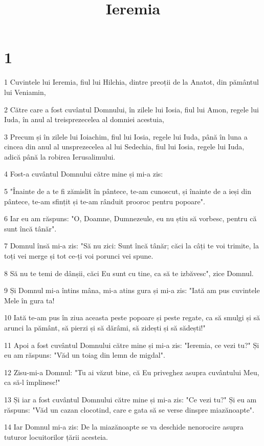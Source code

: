 

\title{Ieremia}


\chapter{1}

\par 1 Cuvintele lui Ieremia, fiul lui Hilchia, dintre preoții de la Anatot, din pământul lui Veniamin,
\par 2 Către care a fost cuvântul Domnului, în zilele lui Iosia, fiul lui Amon, regele lui Iuda, în anul al treisprezecelea al domniei acestuia,
\par 3 Precum și în zilele lui Ioiachim, fiul lui Iosia, regele lui Iuda, până în luna a cincea din anul al unsprezecelea al lui Sedechia, fiul lui Iosia, regele lui Iuda, adică până la robirea Ierusalimului.
\par 4 Fost-a cuvântul Domnului către mine și mi-a zis:
\par 5 "Înainte de a te fi zămislit în pântece, te-am cunoscut, și înainte de a ieși din pântece, te-am sfințit și te-am rânduit prooroc pentru popoare".
\par 6 Iar eu am răspuns: "O, Doamne, Dumnezeule, eu nu știu să vorbesc, pentru că sunt încă tânăr".
\par 7 Domnul însă mi-a zis: "Să nu zici: Sunt încă tânăr; căci la câți te voi trimite, la toți vei merge și tot ce-ți voi porunci vei spune.
\par 8 Să nu te temi de dânșii, căci Eu sunt cu tine, ca să te izbăvesc", zice Domnul.
\par 9 Și Domnul mi-a întins mâna, mi-a atins gura și mi-a zis: "Iată am pus cuvintele Mele în gura ta!
\par 10 Iată te-am pus în ziua aceasta peste popoare și peste regate, ca să smulgi și să arunci la pământ, să pierzi și să dărâmi, să zidești și să sădești!"
\par 11 Apoi a fost cuvântul Domnului către mine și mi-a zis: "Ieremia, ce vezi tu?" Și eu am răspuns: "Văd un toiag din lemn de migdal".
\par 12 Zisu-mi-a Domnul: "Tu ai văzut bine, că Eu priveghez asupra cuvântului Meu, ca să-l împlinesc!"
\par 13 Și iar a fost cuvântul Domnului către mine și mi-a zis: "Ce vezi tu?" Și eu am răspuns: "Văd un cazan clocotind, care e gata să se verse dinspre miazănoapte".
\par 14 Iar Domnul mi-a zis: De la miazănoapte se va deschide nenorocire asupra tuturor locuitorilor țării acesteia.
